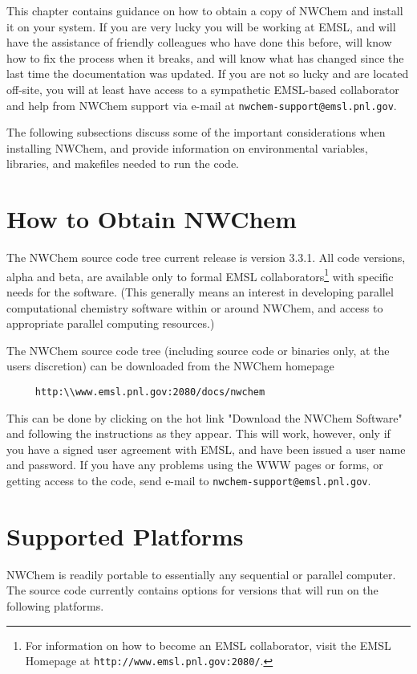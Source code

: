\label{sec:install}

This chapter contains guidance on how to obtain a copy of NWChem and
install it on your system.  If you are very lucky you will be working
at EMSL, and will have the assistance of friendly colleagues who have
done this before, will know how to fix the process when it breaks,
and will know what has changed since the last time the documentation
was updated.
If you are not so lucky and are located off-site, you will at least have
access to a sympathetic EMSL-based collaborator and help from NWChem 
support via e-mail at {\tt nwchem-support@emsl.pnl.gov}.

The following subsections discuss some of the important considerations
when installing NWChem, and provide information on environmental
variables, libraries, and makefiles needed to run the code.

\section{How to Obtain NWChem}

The NWChem source code tree current release is version 3.3.1.  All code versions, alpha and
beta, are available only to formal EMSL collaborators\footnote{For information on
how to become an EMSL collaborator, visit the EMSL Homepage at 
\verb+http://www.emsl.pnl.gov:2080/+.} with specific
needs for the software.  (This generally means an interest in developing
parallel computational chemistry software within or around NWChem, and
access to appropriate parallel computing resources.)

The NWChem source code tree (including source code or binaries only, at the
users discretion) can be downloaded from the NWChem homepage 

\begin{verbatim}
     http:\\www.emsl.pnl.gov:2080/docs/nwchem
\end{verbatim}

This can be done by clicking on the hot link "Download the NWChem Software" and following the
instructions as they appear.  This will work, however, only if you have
a signed user agreement
with EMSL, and have been issued a user name and password.  If you have any problems
using the WWW pages or forms, or getting access to the code, send e-mail to
{\tt nwchem-support@emsl.pnl.gov}.

\section{Supported Platforms}
\label{sec:platforms}
NWChem is readily portable to essentially any sequential or parallel computer.  
The source code currently contains options for versions that will run
on the following platforms.

